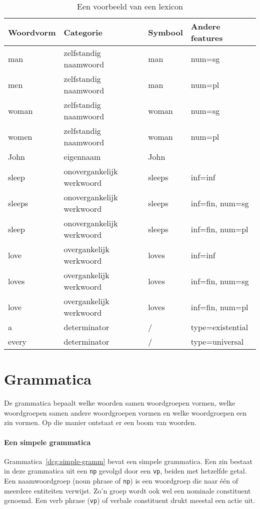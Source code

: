 \begin{table}[!]
  \centering
  \begin{tabular}{@{}llll@{}}
    \toprule
    \textbf{Woordvorm} & \textbf{Categorie} & \textbf{Symbool} & \textbf{Andere features} \\ \midrule
    man                & zelfstandig naamwoord     & man     & num=sg            \\
    men                & zelfstandig naamwoord     & man     & num=pl            \\
    woman              & zelfstandig naamwoord     & woman   & num=sg            \\
    women              & zelfstandig naamwoord     & woman   & num=pl            \\
    John               & eigennaam                 & John    &                   \\
    sleep              & onovergankelijk werkwoord & sleeps  & inf=inf           \\
    sleeps             & onovergankelijk werkwoord & sleeps  & inf=fin, num=sg   \\
    sleep              & onovergankelijk werkwoord & sleeps  & inf=fin, num=pl   \\
    love               & overgankelijk werkwoord   & loves   & inf=inf           \\
    loves              & overgankelijk werkwoord   & loves   & inf=fin, num=sg   \\
    love               & overgankelijk werkwoord   & loves   & inf=fin, num=pl   \\
    a                  & determinator              & /       & type=existential  \\
    every              & determinator              & /       & type=universal    \\
    \bottomrule
  \end{tabular}
  \caption{Een voorbeeld van een lexicon}
  \label{tbl:lexicon}
\end{table}

\section{Grammatica}
De grammatica bepaalt welke woorden samen woordgroepen vormen, welke woordgroepen samen andere woordgroepen vormen en welke woordgroepen een zin vormen. Op die manier ontstaat er een boom van woorden.

\paragraph{Een simpele grammatica} Grammatica~\ref{dcg:simple-gramm} bevat een simpele grammatica. Een zin bestaat in deze grammatica uit een \texttt{np} gevolgd door een \texttt{vp}, beiden met hetzelfde getal. Een naamwoordgroep (noun phrase of \texttt{np}) is een woordgroep die naar één of meerdere entiteiten verwijst. Zo'n groep wordt ook wel een nominale constituent genoemd. Een verb phrase (\texttt{vp}) of verbale constituent drukt meestal een actie uit.

